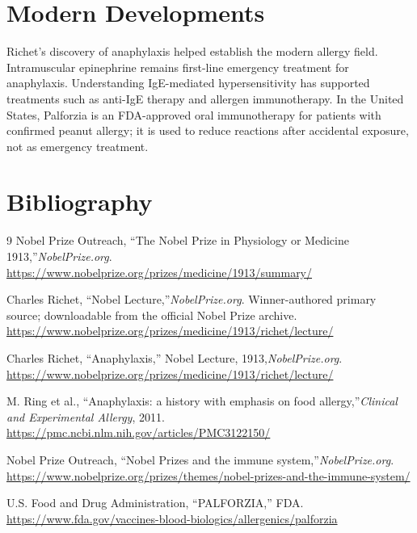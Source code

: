 \section{Modern Developments}

Richet's discovery of anaphylaxis helped establish the modern allergy field. Intramuscular epinephrine remains first-line emergency treatment for anaphylaxis. Understanding IgE-mediated hypersensitivity has supported treatments such as anti-IgE therapy and allergen immunotherapy. In the United States, Palforzia is an FDA-approved oral immunotherapy for patients with confirmed peanut allergy; it is used to reduce reactions after accidental exposure, not as emergency treatment.\cite{richet-modern}


\section{Bibliography}

\begin{thebibliography}{9}
Nobel Prize Outreach, ``The Nobel Prize in Physiology or Medicine 1913,''\emph{NobelPrize.org}.\\
\url{https://www.nobelprize.org/prizes/medicine/1913/summary/}

Charles Richet, ``Nobel Lecture,''\emph{NobelPrize.org}. Winner-authored primary source; downloadable from the official Nobel Prize archive.\\
\url{https://www.nobelprize.org/prizes/medicine/1913/richet/lecture/}

Charles Richet, ``Anaphylaxis,'' Nobel Lecture, 1913,\emph{NobelPrize.org}.\\
\url{https://www.nobelprize.org/prizes/medicine/1913/richet/lecture/}

M. Ring et al., ``Anaphylaxis: a history with emphasis on food allergy,''\emph{Clinical and Experimental Allergy}, 2011.\\
\url{https://pmc.ncbi.nlm.nih.gov/articles/PMC3122150/}

Nobel Prize Outreach, ``Nobel Prizes and the immune system,''\emph{NobelPrize.org}.\\
\url{https://www.nobelprize.org/prizes/themes/nobel-prizes-and-the-immune-system/}

U.S. Food and Drug Administration, ``PALFORZIA,'' FDA.\\
\url{https://www.fda.gov/vaccines-blood-biologics/allergenics/palforzia}
\end{thebibliography}
